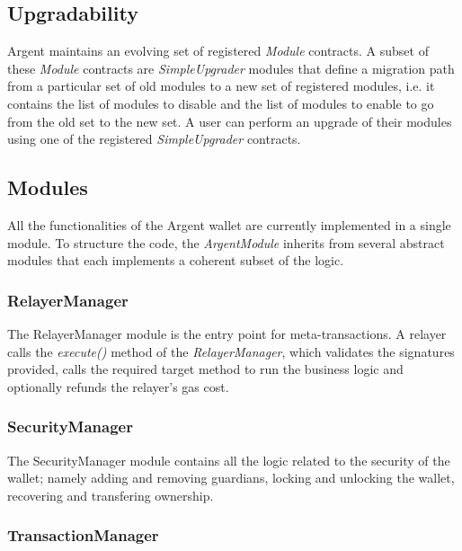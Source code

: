 \documentclass[12pt]{article}
\begin{document}
\subsection{Upgradability}
\label{sec:upgradability}
Argent maintains an evolving set of registered \emph{Module} contracts. A subset of these \emph{Module} contracts are \emph{SimpleUpgrader} modules that define a migration path from a particular set of old modules to a new set of registered modules, i.e. it contains the list of modules to disable and the list of modules to enable to go from the old set to the new set. A user can perform an upgrade of their modules using one of the registered \emph{SimpleUpgrader} contracts.

\subsection{Modules}
All the functionalities of the Argent wallet are currently implemented in a single module. To structure the code, the \emph{ArgentModule} inherits from several abstract modules that each implements a coherent subset of the logic.

\subsubsection{RelayerManager}\label{RelayerManager}

The RelayerManager module is the entry point for meta-transactions. A relayer calls the \emph{execute()} method of the \emph{RelayerManager}, which validates the signatures provided, calls the required target method to run the business logic and optionally refunds the relayer's gas cost.

\subsubsection{SecurityManager}

The SecurityManager module contains all the logic related to the security of the wallet; namely adding and removing guardians, locking and unlocking the wallet, recovering and transfering ownership.

\subsubsection{TransactionManager}
\end{document}
